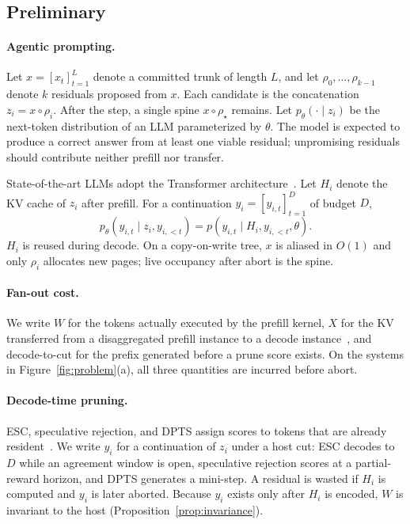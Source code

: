 \section{\sys}
\label{sec:method}

\subsection{Preliminary}
\label{sec:prelim}

\paragraph{Agentic prompting.}
Let $x=[x_t]_{t=1}^{L}$ denote a committed trunk of length $L$, and let $\rho_0,\ldots,\rho_{k-1}$ denote $k$ residuals proposed from $x$.
Each candidate is the concatenation $z_i=x\circ\rho_i$.
After the step, a single spine $x\circ\rho_{\star}$ remains.
Let $p_{\theta}(\cdot\mid z_i)$ be the next-token distribution of an LLM parameterized by $\theta$.
The model is expected to produce a correct answer from at least one viable residual; unpromising residuals should contribute neither prefill nor transfer.

State-of-the-art LLMs adopt the Transformer architecture~\citep{transformer}.
Let $H_i$ denote the KV cache of $z_i$ after prefill.
For a continuation $y_i=[y_{i,t}]_{t=1}^{D}$ of budget $D$,
\begin{equation}
\label{eq:decode}
p_{\theta}(y_{i,t}\mid z_i,y_{i,<t})=p(y_{i,t}\mid H_i,y_{i,<t},\theta).
\end{equation}
$H_i$ is reused during decode.
On a copy-on-write tree, $x$ is aliased in $O(1)$ and only $\rho_i$ allocates new pages; live occupancy after abort is the spine.

\paragraph{Fan-out cost.}
We write $W$ for the tokens actually executed by the prefill kernel, $X$ for the KV transferred from a disaggregated prefill instance to a decode instance~\citep{distserve,splitwise}, and decode-to-cut for the prefix generated before a prune score exists.
On the systems in Figure~\ref{fig:problem}(a), all three quantities are incurred before abort.

\paragraph{Decode-time pruning.}
ESC, speculative rejection, and DPTS assign scores to tokens that are already resident~\citep{esc,specrej,dpts}.
We write $y_i$ for a continuation of $z_i$ under a host cut: ESC decodes to $D$ while an agreement window is open, speculative rejection scores at a partial-reward horizon, and DPTS generates a mini-step.
A residual is wasted if $H_i$ is computed and $y_i$ is later aborted.
Because $y_i$ exists only after $H_i$ is encoded, $W$ is invariant to the host (Proposition~\ref{prop:invariance}).

